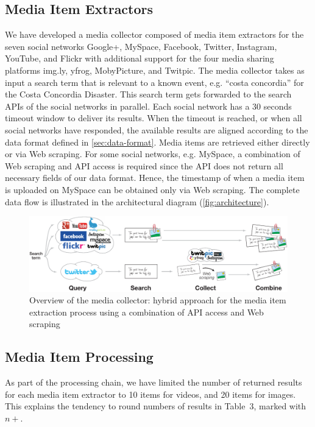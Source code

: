 \subsection{Media Item Extractors}
We have developed a media collector composed of media item extractors for the seven social networks Google+, MySpace, Facebook, Twitter, Instagram, YouTube, and Flickr with additional support for the four media sharing platforms img.ly, yfrog, MobyPicture, and Twitpic. The media collector takes as input a search term that is relevant to a known event, e.g. ``costa concordia'' for the Costa Concordia Disaster. This search term gets forwarded to the search APIs of the social networks in parallel. Each social network has a 30 seconds timeout window to deliver its results. When the timeout is reached, or when all social networks have responded,
the available results are aligned according to the data format defined in \autoref{sec:data-format}. Media items are retrieved either directly or via Web scraping. For some social networks, e.g. MySpace, a combination of Web scraping and API access is required since the API does not return all necessary fields of our data format. Hence, the timestamp of when a media item is uploaded on MySpace can be obtained only via Web scraping. The complete data flow is illustrated in the architectural diagram (\autoref{fig:architecture}).
\begin{figure}
\centering
\includegraphics[width=1.0\linewidth]{architecture.pdf}
\caption{Overview of the media collector: hybrid approach for the media item extraction process using a combination of API access and Web scraping}
\label{fig:architecture}
\end{figure}

\subsection{Media Item Processing}
As part of the processing chain, we have limited the number of returned results for each media item extractor to 10 items for videos, and 20 items for images. This explains the tendency to round numbers of results in Table~3, marked with $n+$.

